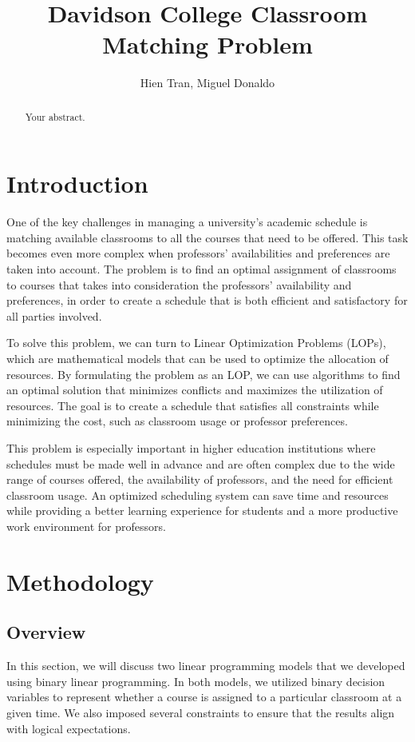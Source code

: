 \documentclass{article}
\title{Davidson College Classroom Matching Problem}
\author{Hien Tran, Miguel Donaldo}
\begin{document}
\maketitle

\begin{abstract}
Your abstract.
\end{abstract}

\section{Introduction}

One of the key challenges in managing a university's academic schedule is matching available classrooms to all the courses that need to be offered. This task becomes even more complex when professors' availabilities and preferences are taken into account. The problem is to find an optimal assignment of classrooms to courses that takes into consideration the professors' availability and preferences, in order to create a schedule that is both efficient and satisfactory for all parties involved.

To solve this problem, we can turn to Linear Optimization Problems (LOPs), which are mathematical models that can be used to optimize the allocation of resources. By formulating the problem as an LOP, we can use algorithms to find an optimal solution that minimizes conflicts and maximizes the utilization of resources. The goal is to create a schedule that satisfies all constraints while minimizing the cost, such as classroom usage or professor preferences.

This problem is especially important in higher education institutions where schedules must be made well in advance and are often complex due to the wide range of courses offered, the availability of professors, and the need for efficient classroom usage. An optimized scheduling system can save time and resources while providing a better learning experience for students and a more productive work environment for professors.

\section{Methodology}

\subsection{Overview}

In this section, we will discuss two linear programming models that we developed using binary linear programming. In both models, we utilized binary decision variables to represent whether a course is assigned to a particular classroom at a given time. We also imposed several constraints to ensure that the results align with logical expectations.
\end{document}
